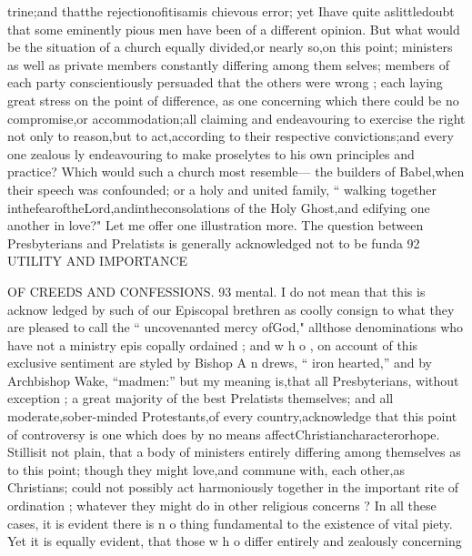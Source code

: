 \documentclass[
]{book}
\begin{document}
trine;and thatthe rejectionofitisamis
chievous error; yet Ihave quite aslittledoubt that some eminently pious men have been of a different opinion. But what would be the situation of a church equally divided,or nearly
so,on this point; ministers as well as private members constantly differing among them
selves; members of each party conscientiously persuaded that the others were wrong ; each laying great stress on the point of difference, as one concerning which there could be no
compromise,or accommodation;all claiming and endeavouring to exercise the right not only to reason,but to act,according to their respective convictions;and every one zealous ly endeavouring to make proselytes to his own principles and practice? Which would such a church most resemble--- the builders of Babel,when their speech was confounded; or a holy and united family, `` walking together inthefearoftheLord,andintheconsolations
of the Holy Ghost,and edifying one another in love?"
Let me offer one illustration more. The question between Presbyterians and Prelatists is generally acknowledged not to be funda
92 UTILITY AND IMPORTANCE

OF CREEDS AND CONFESSIONS. 93
mental. I do not mean that this is acknow
ledged by such of our Episcopal brethren as
coolly consign to what they are pleased to call
the `` uncovenanted mercy ofGod," allthose denominations who have not a ministry epis
copally ordained ; and w h o , on account of this
exclusive sentiment are styled by Bishop A n
drews, `` iron hearted,'' and by Archbishop
Wake, ``madmen:'' but my meaning is,that
all Presbyterians, without exception ; a great
majority of the best Prelatists themselves;
and all moderate,sober-minded Protestants,of
every country,acknowledge that this point of
controversy is one which does by no means affectChristiancharacterorhope. Stillisit
not plain, that a body of ministers entirely differing among themselves as to this point; though they might love,and commune with, each other,as Christians; could not possibly act harmoniously together in the important rite of ordination ; whatever they might do in other religious concerns ?
In all these cases, it is evident there is n o
thing fundamental to the existence of vital
piety. Yet it is equally evident, that those w h o differ entirely and zealously concerning
\end{document}
